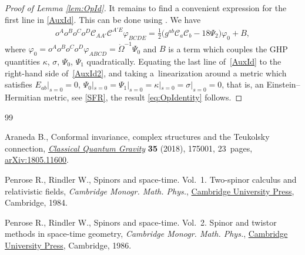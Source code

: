 \documentclass[10pt,a4paper]{amsart}
\numberwithin{equation}{section}
\begin{document}
\begin{proof}[Proof of Lemma \ref{lem:OpId}]
It remains to find a convenient expression for the first line in \eqref{AuxId}. This can be done using \cite[equations~(3.6) and (3.15)]{araneda2018conformal}. We have
\begin{align}\label{AuxId2}
o^Ao^Bo^Co^D\mathcal{C}_{AA'}\mathcal{C}^{A'E}\varphi_{BCDE} =
\frac{1}{2} \bigl(g^{ab}\mathcal{C}_{a}\mathcal{C}_{b}-18\Psi_{2}\bigr)\varphi_{0} + B,
\end{align}
where $\varphi_{0}= o^Ao^Bo^Co^D\varphi_{ABCD}=\mathring{\Omega}^{-1}\Psi_0$ and $B$ is a term which couples the GHP quantities $\kappa$, $\sigma$, $\Psi_0$, $\Psi_1$ quadratically. Equating the last line of~\eqref{AuxId} to the right-hand side of~\eqref{AuxId2}, and taking a~linearization around a metric which satisfies $E_{ab}|_{s=0}=0$, ${\Psi_{0}|_{s=0}=\Psi_{1}|_{s=0}=\kappa|_{s=0}=\sigma|_{s=0}=0}$, that is, an Einstein--Hermitian metric, see \eqref{SFR}, the result \eqref{eq:OpIdentity} follows.
\end{proof}

\begin{thebibliography}{99}

Araneda B., Conformal invariance, complex structures and the {T}eukolsky
 connection, \href{https://doi.org/10.1088/1361-6382/aad13b}{\textit{Classical Quantum Gravity}} \textbf{35} (2018), 175001,
 23~pages, \href{https://arxiv.org/abs/1805.11600}{arXiv:1805.11600}.

Penrose R., Rindler W., Spinors and space-time. {V}ol.~1. {T}wo-spinor calculus
 and relativistic fields, \textit{Cambridge Monogr. Math. Phys.}, \href{https://doi.org/10.1017/CBO9780511564048}{Cambridge University
 Press}, Cambridge, 1984.

Penrose R., Rindler W., Spinors and space-time. {V}ol.~2. Spinor and twistor
 methods in space-time geometry, \textit{Cambridge Monogr. Math. Phys.}, \href{https://doi.org/10.1017/CBO9780511524486}{Cambridge
 University Press}, Cambridge, 1986.

\end{thebibliography}
\end{document}

